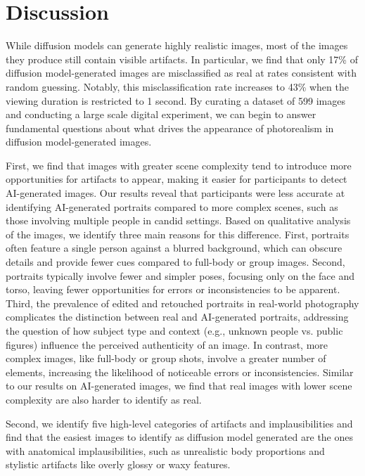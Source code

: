 \section{Discussion}\label{sec:disc}

While diffusion models can generate highly realistic images, most of the images they produce still contain visible artifacts. In particular, we find that only 17\% of diffusion model-generated images are misclassified as real at rates consistent with random guessing. Notably, this misclassification rate increases to 43\% when the viewing duration is restricted to 1 second. By curating a dataset of 599 images and conducting a large scale digital experiment, we can begin to answer fundamental questions about what drives the appearance of photorealism in diffusion model-generated images. 

First, we find that images with greater scene complexity tend to introduce more opportunities for artifacts to appear, making it easier for participants to detect AI-generated images. Our results reveal that participants were less accurate at identifying AI-generated portraits compared to more complex scenes, such as those involving multiple people in candid settings.  Based on qualitative analysis of the images, we identify three main reasons for this difference. First, portraits often feature a single person against a blurred background, which can obscure details and provide fewer cues compared to full-body or group images. Second, portraits typically involve fewer and simpler poses, focusing only on the face and torso, leaving fewer opportunities for errors or inconsistencies to be apparent. Third, the prevalence of edited and retouched portraits in real-world photography complicates the distinction between real and AI-generated portraits, addressing the question of how subject type and context (e.g., unknown people vs. public figures) influence the perceived authenticity of an image. In contrast, more complex images, like full-body or group shots, involve a greater number of elements, increasing the likelihood of noticeable errors or inconsistencies. Similar to our results on AI-generated images, we find that real images with lower scene complexity are also harder to identify as real. 

Second, we identify five high-level categories of artifacts and implausibilities and find that the easiest images to identify as diffusion model generated are the ones with anatomical implausibilities, such as unrealistic body proportions and stylistic artifacts like overly glossy or waxy features.

